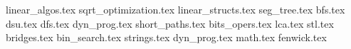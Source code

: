 \documentclass[a5paper, 10pt, twoside]{article}
\begin{document}
\newpage

\tableofcontents
\newpage

{linear_algos.tex}
{sqrt_optimization.tex}
{linear_structs.tex}
{seg_tree.tex}
{bfs.tex}
{dsu.tex}
{dfs.tex}
{dyn_prog.tex}
{short_paths.tex}
{bits_opers.tex}
{lca.tex}
{stl.tex}
{bridges.tex}
{bin_search.tex}
{strings.tex}
{dyn_prog.tex}
{math.tex}
{fenwick.tex}

\newpage
\thispagestyle{empty}

\end{document}
